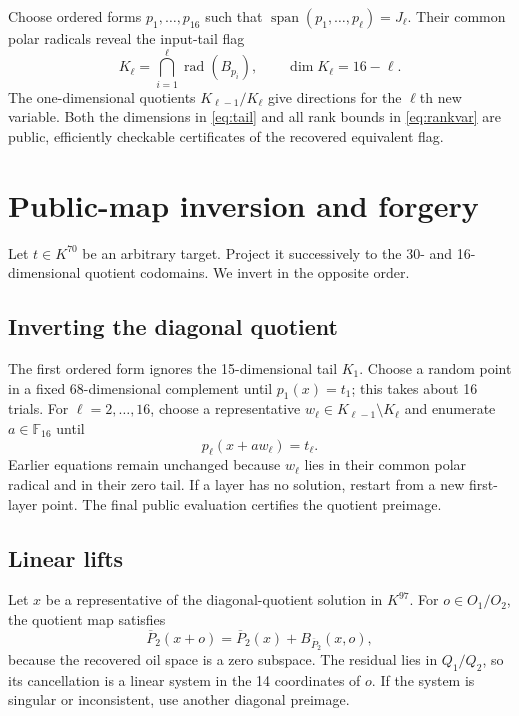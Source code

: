 \documentclass[11pt]{article}
\newcommand{\F}{\mathbb{F}}
\newcommand{\Span}{\operatorname{span}}
\newcommand{\rad}{\operatorname{rad}}
\begin{document}
Choose ordered forms $p_1,\ldots,p_{16}$ such that
$\Span(p_1,\ldots,p_\ell)=J_\ell$.  Their common polar radicals reveal the
input-tail flag
\begin{equation}
       K_\ell=\bigcap_{i=1}^{\ell}\rad(B_{p_i}),
       \qquad \dim K_\ell=16-\ell.                    \label{eq:tail}
\end{equation}
The one-dimensional quotients $K_{\ell-1}/K_\ell$ give directions for the
$\ell$th new variable.  Both the dimensions in \eqref{eq:tail} and all rank
bounds in \eqref{eq:rankvar} are public, efficiently checkable certificates
of the recovered equivalent flag.

\section{Public-map inversion and forgery}

Let $t\in K^{70}$ be an arbitrary target.  Project it successively to the
30- and 16-dimensional quotient codomains.  We invert in the opposite order.

\subsection{Inverting the diagonal quotient}

The first ordered form ignores the 15-dimensional tail $K_1$.  Choose a
random point in a fixed 68-dimensional complement until
$p_1(x)=t_1$; this takes about 16 trials.  For
$\ell=2,\ldots,16$, choose a representative
$w_\ell\in K_{\ell-1}\setminus K_\ell$ and enumerate
$a\in\F_{16}$ until
\[
       p_\ell(x+a w_\ell)=t_\ell.
\]
Earlier equations remain unchanged because $w_\ell$ lies in their common
polar radical and in their zero tail.  If a layer has no solution, restart
from a new first-layer point.  The final public evaluation certifies the
quotient preimage.

\subsection{Linear lifts}

Let $x$ be a representative of the diagonal-quotient solution in $K^{97}$.
For $o\in O_1/O_2$, the quotient map satisfies
\[
  \overline P_2(x+o)=\overline P_2(x)+B_{\overline P_2}(x,o),
\]
because the recovered oil space is a zero subspace.  The residual lies in
$Q_1/Q_2$, so its cancellation is a linear system in the 14 coordinates of
$o$.  If the system is singular or inconsistent, use another diagonal
preimage.
\end{document}
